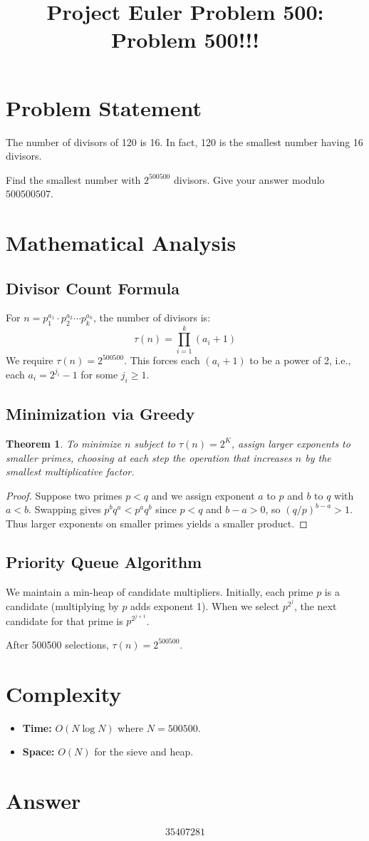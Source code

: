 \documentclass[12pt]{article}
\title{Project Euler Problem 500: Problem 500!!!}
\author{}
\date{}
\newtheorem{theorem}{Theorem}
\theoremstyle{definition}
\begin{document}
\maketitle

\section{Problem Statement}
The number of divisors of 120 is 16. In fact, 120 is the smallest number having 16 divisors.

Find the smallest number with $2^{500500}$ divisors. Give your answer modulo $500500507$.

\section{Mathematical Analysis}

\subsection{Divisor Count Formula}
For $n = p_1^{a_1} \cdot p_2^{a_2} \cdots p_k^{a_k}$, the number of divisors is:
\[
\tau(n) = \prod_{i=1}^{k} (a_i + 1)
\]
We require $\tau(n) = 2^{500500}$. This forces each $(a_i + 1)$ to be a power of 2, i.e., each $a_i = 2^{j_i} - 1$ for some $j_i \geq 1$.

\subsection{Minimization via Greedy}
\begin{theorem}
To minimize $n$ subject to $\tau(n) = 2^K$, assign larger exponents to smaller primes, choosing at each step the operation that increases $n$ by the smallest multiplicative factor.
\end{theorem}

\begin{proof}
Suppose two primes $p < q$ and we assign exponent $a$ to $p$ and $b$ to $q$ with $a < b$. Swapping gives $p^b q^a < p^a q^b$ since $p < q$ and $b - a > 0$, so $(q/p)^{b-a} > 1$. Thus larger exponents on smaller primes yields a smaller product.
\end{proof}

\subsection{Priority Queue Algorithm}
We maintain a min-heap of candidate multipliers. Initially, each prime $p$ is a candidate (multiplying by $p$ adds exponent 1). When we select $p^{2^j}$, the next candidate for that prime is $p^{2^{j+1}}$.

After 500500 selections, $\tau(n) = 2^{500500}$.

\section{Complexity}
\begin{itemize}
    \item \textbf{Time:} $O(N \log N)$ where $N = 500500$.
    \item \textbf{Space:} $O(N)$ for the sieve and heap.
\end{itemize}

\section{Answer}

\[
\boxed{35407281}
\]
\end{document}
